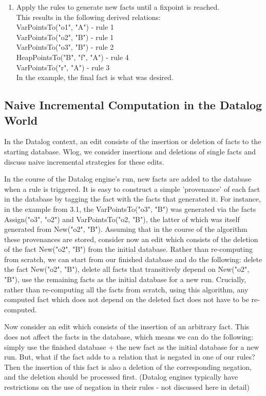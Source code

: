 \documentclass[acmlarge,anonymous]{acmart}\settopmatter{printfolios=true}
\begin{document}
\begin{enumerate}
    \item Apply the rules to generate new facts until a fixpoint is reached.\\
    This results in the following derived relations:\\
    VarPointsTo("o1", "A") - rule 1\\
    VarPointsTo("o2", "B") - rule 1\\
    VarPointsTo("o3", "B") - rule 2\\
    HeapPointsTo("B", "f", "A") - rule 4\\
    VarPointsTo("r", "A") - rule 3\\
    
    In the example, the final fact is what was desired.
\end{enumerate}

\subsection{Naive Incremental Computation in the Datalog World}

In the Datalog context, an edit consists of the insertion or deletion of facts to the starting database. Wlog, we consider insertions and deletions of single facts and discuss naive incremental strategies for these edits.

In the course of the Datalog engine's run, new facts are added to the database when a rule is triggered. It is easy to construct a simple 'provenance' of each fact in the database by tagging the fact with the facts that generated it. For instance, in the example from 3.1, the VarPointsTo("o3", "B") was generated via the facts Assign("o3", "o2") and VarPointsTo("o2, "B"), the latter of which was itself generated from New("o2", "B"). Assuming that in the course of the algorithm these provenances are stored, consider now an edit which consists of the deletion of the fact New("o2", "B") from the initial database. Rather than re-computing from scratch, we can start from our finished database and do the following: delete the fact New("o2", "B"), delete all facts that transitively depend on New("o2", "B"), use the remaining facts as the initial database for a new run. Crucially, rather than re-computing all the facts from scratch, using this algorithm, any computed fact which does not depend on the deleted fact does not have to be re-computed.

Now consider an edit which consists of the insertion of an arbitrary fact. This does not affect the facts in the database, which means we can do the following: simply use the finished database + the new fact as the initial database for a new run. But, what if the fact adds to a relation that is negated in one of our rules? Then the insertion of this fact is also a deletion of the corresponding negation, and the deletion should be processed first. (Datalog engines typically have restrictions on the use of negation in their rules - not discussed here in detail)
\end{document}
